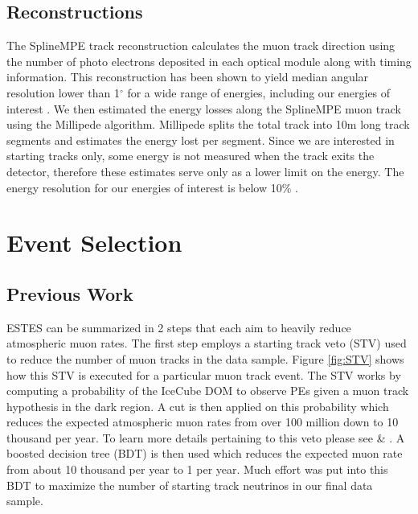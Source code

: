 \documentclass{PoS}
\begin{document}
\subsection{Reconstructions}\label{sec:Reco}
The SplineMPE track reconstruction calculates the muon track direction using the number of photo electrons deposited in each optical module along with timing information. This reconstruction has been shown to yield median angular resolution lower than 1$^\circ$ for a wide range of energies, including our energies of interest \cite{angular_res}. We then estimated the energy losses along the SplineMPE muon track using the Millipede algorithm. Millipede splits the total track into 10m long track segments and estimates the energy lost per segment. Since we are interested in starting tracks only, some energy is not measured when the track exits the detector, therefore these estimates serve only as a lower limit on the energy. The energy resolution for our energies of interest is below 10$\%$ \cite{energy_res}.


\section{Event Selection}\label{sec:ESTES}
\subsection{Previous Work}\label{sec:ESTES_startingtrack}
ESTES can be summarized in 2 steps that each aim to heavily reduce atmospheric muon rates. The first step employs a starting track veto (STV) used to reduce the number of muon tracks in the data sample. Figure \ref{fig:STV} shows how this STV is executed for a particular muon track event. The STV works by computing a probability of the IceCube DOM to observe PEs given a muon track hypothesis in the dark region. A cut is then applied on this probability which reduces the expected atmospheric muon rates from over 100 million down to 10 thousand per year. To learn more details pertaining to this veto please see \cite{Kyle:ESTES} \& \cite{Mancina:ESTES}. A boosted decision tree (BDT) is then used which reduces the expected muon rate from about 10 thousand per year to 1 per year. Much effort was put into this BDT to maximize the number of starting track neutrinos in our final data sample.
\end{document}
